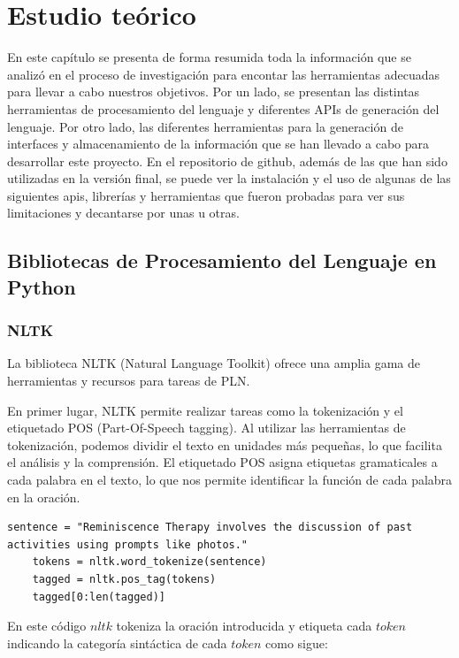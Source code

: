 \chapter{Estudio teórico}
\label{cap:Estudio teórico}
En este capítulo se presenta de forma resumida toda la información que se analizó en el proceso de investigación para encontar las herramientas adecuadas para llevar a cabo nuestros objetivos. Por un lado, se presentan las distintas herramientas de procesamiento del lenguaje y diferentes APIs de generación del lenguaje. Por otro lado, las diferentes herramientas para la generación de interfaces y almacenamiento de la información que se han llevado a cabo para desarrollar este proyecto. En el repositorio de github, además de las que han sido utilizadas en la versión final, se puede ver la instalación y el uso de algunas de las siguientes apis, librerías y herramientas que fueron probadas para ver sus limitaciones y decantarse por unas u otras. 
\section{Bibliotecas de Procesamiento del Lenguaje en Python}
\subsection{NLTK}
La biblioteca NLTK (Natural Language Toolkit) ofrece una amplia gama de herramientas y recursos para tareas de PLN.

En primer lugar, NLTK permite realizar tareas como la tokenización y el  etiquetado POS (Part-Of-Speech tagging). Al utilizar las herramientas de tokenización, podemos dividir el texto en unidades más pequeñas, lo que facilita el análisis y la comprensión. El etiquetado POS asigna etiquetas gramaticales a cada palabra en el texto, lo que nos permite identificar la función de cada palabra en la oración. 

\begin{lstlisting}[style=SpyderStyle, caption={Ejemplo de código en Python}, captionpos=b, label={lst:python},breaklines = true]
	sentence = "Reminiscence Therapy involves the discussion of past activities using prompts like photos."
	tokens = nltk.word_tokenize(sentence)
	tagged = nltk.pos_tag(tokens)
	tagged[0:len(tagged)]
\end{lstlisting}

En este código $nltk$ tokeniza la oración introducida y etiqueta cada $token$ indicando la categoría sintáctica de cada $token$ como sigue:

